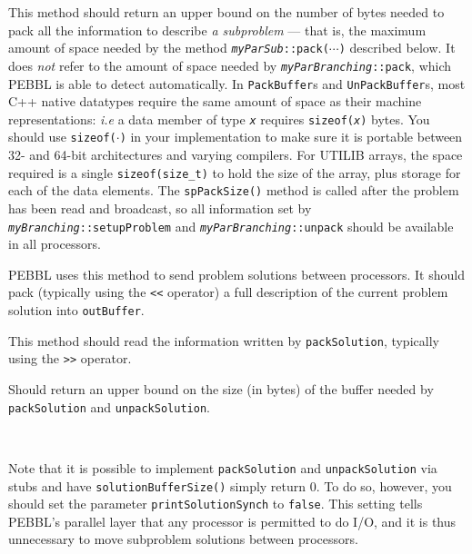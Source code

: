 This method should return an upper bound on
the number of bytes needed to pack all the information to describe
\emph{a subproblem} --- that is, the maximum amount of space needed by
the method \texttt{\emph{myParSub}::pack($\cdots$)} described below.
It does \emph{not} refer to the amount of space needed by
\texttt{\emph{myParBranching}::pack}, which PEBBL is able to detect
automatically. In \texttt{PackBuffer}s and \texttt{UnPackBuffer}s,
most C++ native datatypes require the same amount of space as their
machine representations: \emph{i.e} a data member of type
\texttt{\emph{x}} requires \texttt{sizeof(\emph{x})} bytes.  You
should use \texttt{sizeof($\cdot$)} in your implementation to make
sure it is portable between 32- and 64-bit architectures and varying
compilers.  For UTILIB arrays, the space required is a single
\texttt{sizeof(size\_t)} to hold the size of the array, plus storage
for each of the data elements.  The \texttt{spPackSize()} method is
called after the problem has been read and broadcast, so all
information set by \texttt{\emph{myBranching}::setupProblem} and
\texttt{\emph{myParBranching}::unpack} should be available in all
processors.

PEBBL uses this method to send problem solutions between processors.
It should pack (typically using the \texttt{<<} operator) a full
description of the current problem solution into \texttt{outBuffer}.

This method should
read the information written by \texttt{packSolution}, typically using
the \texttt{>>} operator.

Should return an upper bound on the size (in bytes) of the buffer
needed by \texttt{packSolution} and \texttt{unpackSolution}.

~

Note that it is possible to implement \texttt{packSolution} and
\texttt{unpackSolution} via stubs and have
\texttt{solutionBufferSize()} simply return $0$.  To do so, however,
you should set the parameter \texttt{printSolutionSynch} to
\texttt{false}.  This setting tells PEBBL's parallel layer that
any processor is permitted to do I/O, and it is thus unnecessary to
move subproblem solutions between processors.



